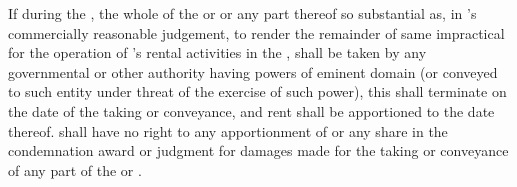 If during the \termOfLease, the whole of the \premises or \building or any part thereof so substantial as, in \lessor's commercially reasonable judgement, to render the remainder of same impractical for the operation of \lessor's rental activities in the \building, shall be taken by any governmental or other authority having powers of eminent domain (or conveyed to such entity under threat of the exercise of such power), this \lease shall terminate on the date of the taking or conveyance, and rent shall be apportioned to the date thereof. \lessee shall have no right to any apportionment of or any share in the condemnation award or judgment for damages made for the taking or conveyance of any part of the \premises or \building.
